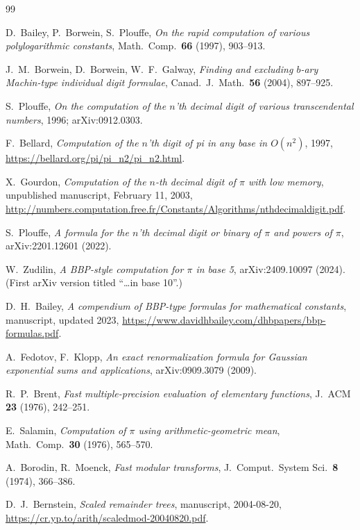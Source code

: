 \documentclass[11pt]{article}
\theoremstyle{remark}
\theoremstyle{definition}
\begin{document}
\begin{thebibliography}{99}

D.~Bailey, P.~Borwein, S.~Plouffe,
\emph{On the rapid computation of various polylogarithmic constants},
Math.\ Comp.\ \textbf{66} (1997), 903--913.

J.~M.~Borwein, D.~Borwein, W.~F.~Galway,
\emph{Finding and excluding $b$-ary Machin-type individual digit formulae},
Canad.\ J.\ Math.\ \textbf{56} (2004), 897--925.

S.~Plouffe,
\emph{On the computation of the $n$'th decimal digit of various
transcendental numbers}, 1996; arXiv:0912.0303.

F.~Bellard,
\emph{Computation of the $n$'th digit of pi in any base in $O(n^{2})$},
1997, \url{https://bellard.org/pi/pi_n2/pi_n2.html}.

X.~Gourdon,
\emph{Computation of the $n$-th decimal digit of $\pi$ with low memory},
unpublished manuscript, February 11, 2003,
\url{http://numbers.computation.free.fr/Constants/Algorithms/nthdecimaldigit.pdf}.

S.~Plouffe,
\emph{A formula for the $n$'th decimal digit or binary of $\pi$ and powers
of $\pi$}, arXiv:2201.12601 (2022).

W.~Zudilin,
\emph{A BBP-style computation for $\pi$ in base 5},
arXiv:2409.10097 (2024). (First arXiv version titled ``\ldots in base 10''.)

D.~H.~Bailey,
\emph{A compendium of BBP-type formulas for mathematical constants},
manuscript, updated 2023,
\url{https://www.davidhbailey.com/dhbpapers/bbp-formulas.pdf}.

A.~Fedotov, F.~Klopp,
\emph{An exact renormalization formula for Gaussian exponential sums and
applications}, arXiv:0909.3079 (2009).

R.~P.~Brent,
\emph{Fast multiple-precision evaluation of elementary functions},
J.~ACM \textbf{23} (1976), 242--251.

E.~Salamin,
\emph{Computation of $\pi$ using arithmetic-geometric mean},
Math.\ Comp.\ \textbf{30} (1976), 565--570.

A.~Borodin, R.~Moenck,
\emph{Fast modular transforms},
J.~Comput.\ System Sci.\ \textbf{8} (1974), 366--386.

D.~J.~Bernstein,
\emph{Scaled remainder trees}, manuscript, 2004-08-20,
\url{https://cr.yp.to/arith/scaledmod-20040820.pdf}.


\end{thebibliography}
\end{document}

